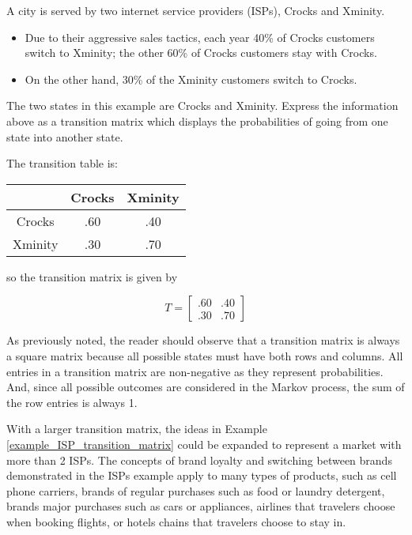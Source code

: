 \begin{example}\label{example_ISP_transition_matrix}
    A city is served by two internet service providers (ISPs), Crocks and Xminity.
    \begin{itemize}
        \item Due to their aggressive sales tactics, each year 40\% of Crocks customers switch to Xminity; the other 60\% of Crocks customers stay with Crocks.
        \item On the other hand, 30\% of the Xminity customers switch to Crocks.
    \end{itemize}
    The two states in this example are Crocks and Xminity. Express the information above as a transition matrix which displays the probabilities of going from one state into another state.
\end{example}
\begin{solution}
    The transition table is:
    \begin{center}
        \begin{tabular}{c|cc}
                    & Crocks & Xminity \\
            \hline
            Crocks  & .60    & .40     \\
            Xminity & .30    & .70     \\
        \end{tabular}
    \end{center}

    so the transition matrix is given by

    \[
        T = \begin{bmatrix}
            .60 & .40 \\
            .30 & .70
        \end{bmatrix}
    \]
\end{solution}
As previously noted, the reader should observe that a transition matrix is always a square matrix because all possible states must have both rows and columns.  All entries in a transition matrix are non-negative as they represent probabilities. And, since all possible outcomes are considered in the Markov process, the sum of the row entries is always 1.

With a larger transition matrix, the ideas in Example \ref{example_ISP_transition_matrix} could be expanded to represent a market with more than 2 ISPs.  The concepts of brand loyalty and switching between brands demonstrated in the ISPs example apply to many types of products, such as cell phone carriers, brands of regular purchases such as food or laundry detergent, brands major purchases such as cars or appliances, airlines that travelers choose when booking flights, or hotels chains that travelers choose to stay in.

